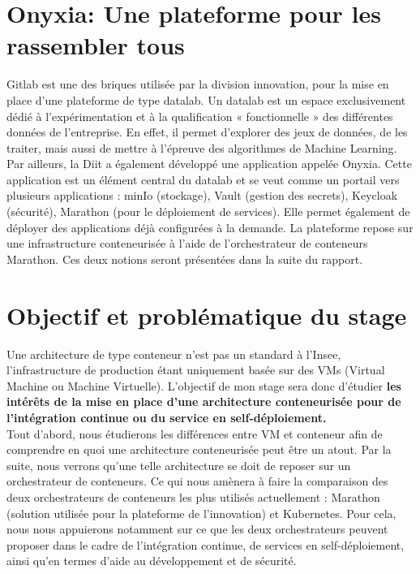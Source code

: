 \documentclass[11pt,fleqn]{book} %
\begin{document}
\section{Onyxia: Une plateforme pour les rassembler tous}
Gitlab est une des briques utilisée par la division innovation, pour la mise en place d'une plateforme de type datalab. Un datalab est un espace exclusivement dédié à l’expérimentation et à la qualification « fonctionnelle » des différentes données de l’entreprise. En effet, il permet d’explorer des jeux de données, de les traiter, mais aussi de mettre à l’épreuve des algorithmes de Machine Learning.\\


Par ailleurs, la Diit a également développé une application appelée Onyxia. Cette application est un élément central du datalab et se veut comme un portail vers plusieurs applications : minIo (stockage), Vault (gestion des secrets), Keycloak (sécurité), Marathon (pour le déploiement de services). Elle permet également de déployer des applications déjà configurées à la demande. La plateforme repose sur une infrastructure conteneurisée à l'aide de l'orchestrateur de conteneurs Marathon. Ces deux notions seront présentées dans la suite du rapport. 



\section{Objectif et problématique du stage}
Une architecture de type conteneur n'est pas un standard à l'Insee, l'infrastructure de production étant uniquement basée sur des VMs (Virtual Machine ou Machine Virtuelle). L'objectif de mon stage sera donc d'étudier \textbf{les intérêts de la mise en place d'une architecture conteneurisée pour de l'intégration continue ou du service en self-déploiement.}\\

Tout d'abord, nous étudierons les différences entre VM et conteneur afin de comprendre en quoi une architecture conteneurisée peut être un atout. Par la suite, nous verrons qu'une telle architecture se doit de reposer sur un orchestrateur de conteneurs. Ce qui nous amènera à faire la comparaison des deux orchestrateurs de conteneurs les plus utilisés actuellement : Marathon (solution utilisée pour la plateforme de l'innovation) et Kubernetes. Pour cela, nous nous appuierons notamment sur ce que les deux orchestrateurs peuvent proposer dans le cadre de l'intégration continue, de services en self-déploiement, ainsi qu'en termes d'aide au développement et de sécurité.
\end{document}
